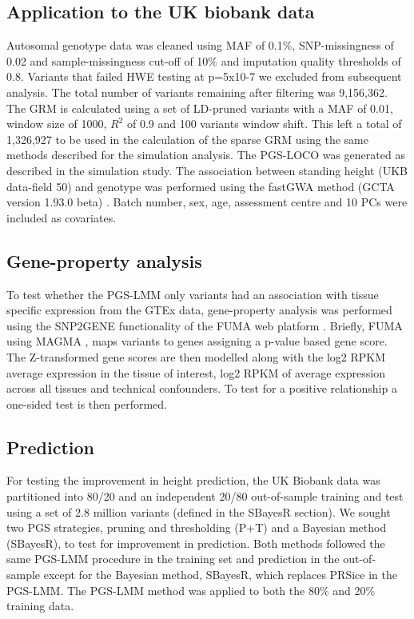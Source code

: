 \documentclass[doublespacing]{bmcart}
\begin{document}
\subsection*{Application to the UK biobank data} 
\par
Autosomal genotype data was cleaned using MAF of 0.1\%, SNP-missingness of 0.02 and sample-missingness cut-off of 10\% and imputation quality thresholds of 0.8. Variants that failed HWE testing at p=5x10-7 we excluded from subsequent analysis. The total number of variants remaining after filtering was 9,156,362. The GRM is calculated using a set of LD-pruned variants with a MAF of 0.01, window size of 1000, $R^2$ of 0.9 and 100 variants window shift. This left a total of 1,326,927 to be used in the calculation of the sparse GRM using the same methods described for the simulation analysis. The PGS-LOCO was generated as described in the simulation study. The association between standing height (UKB data-field 50) and genotype was performed using the fastGWA method (GCTA version 1.93.0 beta) \cite{jiang2019resource}. Batch number, sex, age, assessment centre and 10 PCs were included as covariates. 

\subsection*{Gene-property analysis}

To test whether the PGS-LMM only variants had an association with tissue specific expression from the GTEx data, gene-property analysis was performed using the SNP2GENE functionality of the FUMA web platform \cite{watanabe2017functional}. Briefly, FUMA using MAGMA \cite{de2015magma}, maps variants to genes assigning a p-value based gene score. The Z-transformed gene scores are then modelled along with the log2 RPKM average expression in the tissue of interest, log2 RPKM of average expression across all tissues and technical confounders. To test for a positive relationship a one-sided test is then performed.  

\subsection*{Prediction}
For testing the improvement in height prediction, the UK Biobank data was partitioned into 80/20 and an independent 20/80 out-of-sample training and test using a set of 2.8 million variants (defined in the SBayesR section). We sought two PGS strategies, pruning and thresholding (P+T) and a Bayesian method (SBayesR), to test for improvement in prediction. Both methods followed the same PGS-LMM procedure in the training set and prediction in the out-of-sample except for the Bayesian method, SBayesR, which replaces PRSice in the PGS-LMM. The PGS-LMM method was applied to both the 80\% and 20\% training data. \par
\end{document}
